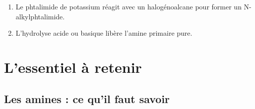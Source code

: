 \begin{propriete}
\begin{enumerate}
    \item Le phtalimide de potassium réagit avec un halogénoalcane pour former un N-alkylphtalimide.
    \item L'hydrolyse acide ou basique libère l'amine primaire pure.
\end{enumerate}
\end{propriete}

\section{L'essentiel à retenir}

\begin{synthese}
\subsection*{Les amines : ce qu'il faut savoir}


\end{synthese}
